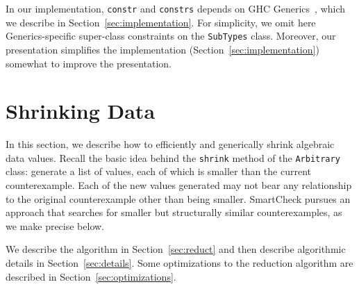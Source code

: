 \documentclass{sigplanconf}
\newcommand{\ttp}[1]{\texttt{#1}}
\begin{document}
In our implementation, \ttp{constr} and \ttp{constrs} depends on GHC
Generics~\cite{generics}, which we describe in Section~\ref{sec:implementation}.
For simplicity, we omit here Generics-specific super-class constraints on the
\ttp{SubTypes} class.  Moreover, our presentation simplifies the implementation
(Section~\ref{sec:implementation}) somewhat to improve the presentation.



\section{Shrinking Data}\label{sec:shrinking}
In this section, we describe how to efficiently and generically shrink algebraic
data values.  Recall the basic idea behind the \ttp{shrink}
method of the \ttp{Arbitrary} class: generate a list of values, each of which is
smaller than the current counterexample.  Each of the new values generated
may not bear any relationship to the original counterexample other than being
smaller.  SmartCheck pursues an approach that searches for smaller but
structurally similar counterexamples, as we make precise below.

We describe the algorithm in Section~\ref{sec:reduct} and then describe
algorithmic details in Section~\ref{sec:details}.  Some optimizations to the
reduction algorithm are described in Section~\ref{sec:optimizations}.


\end{document}
